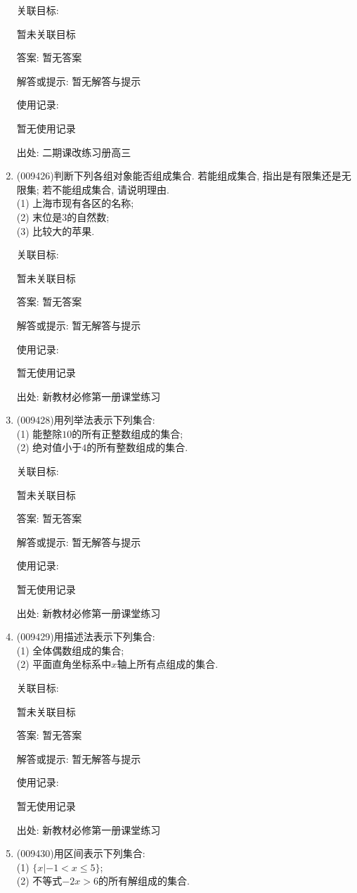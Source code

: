\documentclass[10pt,a4paper]{article}
\begin{document}
\begin{enumerate}[1.]
关联目标:

暂未关联目标

答案: 暂无答案

解答或提示: 暂无解答与提示

使用记录:

暂无使用记录


出处: 二期课改练习册高三
\item { (009426)}判断下列各组对象能否组成集合. 若能组成集合, 指出是有限集还是无限集; 若不能组成集合, 请说明理由.\\
(1) 上海市现有各区的名称;\\
(2) 末位是$3$的自然数;\\
(3) 比较大的苹果.


关联目标:

暂未关联目标

答案: 暂无答案

解答或提示: 暂无解答与提示

使用记录:

暂无使用记录


出处: 新教材必修第一册课堂练习
\item { (009428)}用列举法表示下列集合:\\
(1) 能整除$10$的所有正整数组成的集合;\\
(2) 绝对值小于$4$的所有整数组成的集合.


关联目标:

暂未关联目标

答案: 暂无答案

解答或提示: 暂无解答与提示

使用记录:

暂无使用记录


出处: 新教材必修第一册课堂练习
\item { (009429)}用描述法表示下列集合:\\
(1) 全体偶数组成的集合;\\
(2) 平面直角坐标系中$x$轴上所有点组成的集合.


关联目标:

暂未关联目标

答案: 暂无答案

解答或提示: 暂无解答与提示

使用记录:

暂无使用记录


出处: 新教材必修第一册课堂练习
\item { (009430)}用区间表示下列集合:\\
(1) $\{x|-1<x\le 5\}$;\\
(2) 不等式$-2x>6$的所有解组成的集合.



\end{enumerate}
\end{document}
